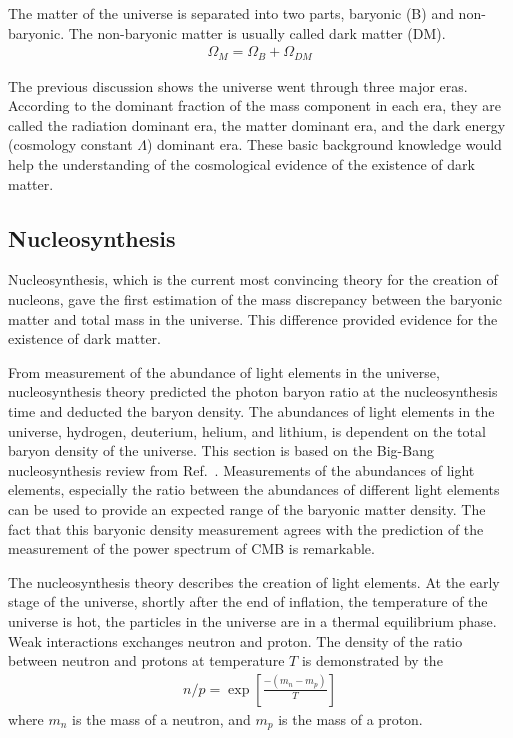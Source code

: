 The matter of the universe is separated into two parts, baryonic (B) and non-baryonic. The non-baryonic matter is usually called dark matter (DM). 
\begin{align}
\Omega_{M} = \Omega_{B} + \Omega_{DM}
\end{align}

The previous discussion shows the universe went through three major eras. According to the dominant fraction of the mass component in each era, they are called the radiation dominant era, the matter dominant era, and the dark energy (cosmology constant $\Lambda$) dominant era. These basic background knowledge would help the understanding of the cosmological evidence of the existence of dark matter.

\subsection{Nucleosynthesis}
Nucleosynthesis, which is the current most convincing theory for the creation of nucleons, gave the first estimation of the mass discrepancy between the baryonic matter and total mass in the universe. This difference provided evidence for the existence of dark matter. 

From measurement of the abundance of light elements in the universe, nucleosynthesis theory predicted the photon baryon ratio at the nucleosynthesis time and deducted the baryon density. The abundances of light elements in the universe, hydrogen, deuterium, helium, and lithium, is dependent on the total baryon density of the universe. This section is based on the Big-Bang nucleosynthesis review from Ref.~\cite{Olive2014}. Measurements of the abundances of light elements, especially the ratio between the abundances of different light elements can be used to provide an expected range of the baryonic matter density. The fact that this baryonic density measurement agrees with the prediction of the measurement of the power spectrum of CMB is remarkable.

The nucleosynthesis theory describes the creation of light elements. At the early stage of the universe, shortly after the end of inflation, the temperature of the universe is hot, the particles in the universe are in a thermal equilibrium phase. Weak interactions exchanges neutron and proton. The density of the ratio between neutron and protons at temperature $T$ is demonstrated by the 
\begin{align}
n/p = \exp \left [\frac{-\left(m_n-m_p\right)}{T} \right]
\end{align}
where $m_n$ is the mass of a neutron, and $m_p$ is the mass of a proton. 


